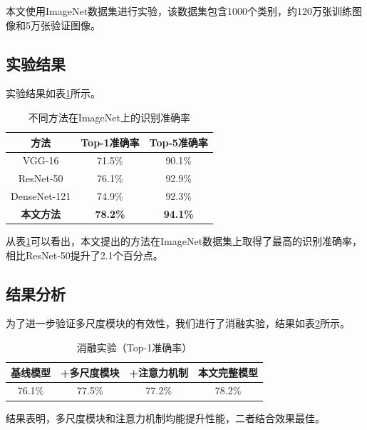 \documentclass[a4paper,12pt]{article}
\begin{document}
本文使用ImageNet数据集进行实验，该数据集包含1000个类别，约120万张训练图像和5万张验证图像。

\subsection{实验结果}

实验结果如表\ref{tab:result}所示。

\begin{table}[H]
    \centering
    \caption{不同方法在ImageNet上的识别准确率}
    \begin{tabular}{ccc}
        \toprule
        \textbf{方法} & \textbf{Top-1准确率} & \textbf{Top-5准确率} \\
        \midrule
        VGG-16 & 71.5\% & 90.1\% \\
        ResNet-50 & 76.1\% & 92.9\% \\
        DenseNet-121 & 74.9\% & 92.3\% \\
        \textbf{本文方法} & \textbf{78.2\%} & \textbf{94.1\%} \\
        \bottomrule
    \end{tabular}
    \label{tab:result}
\end{table}

从表\ref{tab:result}可以看出，本文提出的方法在ImageNet数据集上取得了最高的识别准确率，相比ResNet-50提升了2.1个百分点。

\subsection{结果分析}

为了进一步验证多尺度模块的有效性，我们进行了消融实验，结果如表\ref{tab:ablation}所示。

\begin{table}[H]
    \centering
    \caption{消融实验（Top-1准确率）}
    \begin{tabular}{cccc}
        \toprule
        \textbf{基线模型} & \textbf{+多尺度模块} & \textbf{+注意力机制} & \textbf{本文完整模型} \\
        \midrule
        76.1\% & 77.5\% & 77.2\% & 78.2\% \\
        \bottomrule
    \end{tabular}
    \label{tab:ablation}
\end{table}

结果表明，多尺度模块和注意力机制均能提升性能，二者结合效果最佳。

\clearpage
\end{document}
